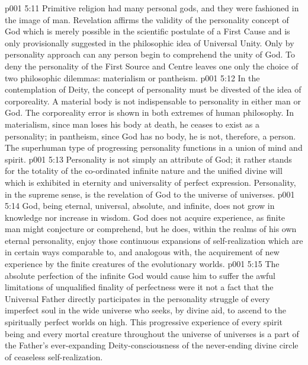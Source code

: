 \vs p001 5:11 Primitive religion had many personal gods, and they were fashioned in the image of man. Revelation affirms the validity of the personality concept of God which is merely possible in the scientific postulate of a First Cause and is only provisionally suggested in the philosophic idea of Universal Unity. Only by personality approach can any person begin to comprehend the unity of God. To deny the personality of the First Source and Centre leaves one only the choice of two philosophic dilemmas: materialism or pantheism.
\vs p001 5:12 In the contemplation of Deity, the concept of personality must be divested of the idea of corporeality. A material body is not indispensable to personality in either man or God. The corporeality error is shown in both extremes of human philosophy. In materialism, since man loses his body at death, he ceases to exist as a personality; in pantheism, since God has no body, he is not, therefore, a person. The superhuman type of progressing personality functions in a union of mind and spirit.
\vs p001 5:13 \pc Personality is not simply an attribute of God; it rather stands for the totality of the co\hyp{}ordinated infinite nature and the unified divine will which is exhibited in eternity and universality of perfect expression. Personality, in the supreme sense, is the revelation of God to the universe of universes.
\vs p001 5:14 \pc God, being eternal, universal, absolute, and infinite, does not grow in knowledge nor increase in wisdom. God does not acquire experience, as finite man might conjecture or comprehend, but he does, within the realms of his own eternal personality, enjoy those continuous expansions of self\hyp{}realization which are in certain ways comparable to, and analogous with, the acquirement of new experience by the finite creatures of the evolutionary worlds.
\vs p001 5:15 The absolute perfection of the infinite God would cause him to suffer the awful limitations of unqualified finality of perfectness were it not a fact that the Universal Father directly participates in the personality struggle of every imperfect soul in the wide universe who seeks, by divine aid, to ascend to the spiritually perfect worlds on high. This progressive experience of every spirit being and every mortal creature throughout the universe of universes is a part of the Father’s ever\hyp{}expanding Deity\hyp{}consciousness of the never\hyp{}ending divine circle of ceaseless self\hyp{}realization.
